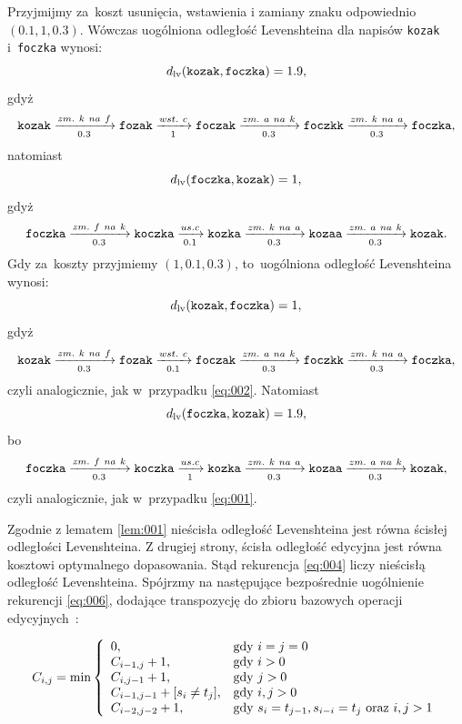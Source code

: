 \documentclass{praca1}
\begin{document}
\begin{example}
Przyjmijmy za~koszt usunięcia, wstawienia i zamiany znaku odpowiednio $(0.1, 1, 0.3)$. Wówczas uogólniona odległość Levenshteina dla napisów \verb|kozak| i~\verb|foczka| wynosi:
\begin{equation}
\label{eq:001}
d_{\mathrm{lv}}(\verb|kozak|, \verb|foczka|) = 1.9,
\end{equation}
gdyż
$$
\verb|kozak|  \xrightarrow[0.3]{zm.\ k\ na\ f} \verb|fozak| \xrightarrow[1]{wst.\ c} \verb|foczak| \xrightarrow[0.3]{zm.\ a\ na\ k} \verb|foczkk| \xrightarrow[0.3]{zm.\ k\ na\ a} \verb|foczka|,
$$
natomiast
\begin{equation}\label{eq:002}
d_{\mathrm{lv}}(\verb|foczka|, \verb|kozak|) = 1,
\end{equation}
gdyż
$$
\verb|foczka|  \xrightarrow[0.3]{zm.\ f\ na\ k} \verb|koczka|  \xrightarrow[0.1]{us. c} \verb|kozka| \xrightarrow[0.3]{zm.\ k\ na\ a} \verb|kozaa| \xrightarrow[0.3]{zm.\ a\ na\ k} \verb|kozak|.
$$
Gdy za~koszty przyjmiemy $(1, 0.1, 0.3)$, to~uogólniona odległość Levenshteina wynosi:
$$
d_{\mathrm{lv}}(\verb|kozak|, \verb|foczka|) = 1,
$$
gdyż
$$
\verb|kozak|  \xrightarrow[0.3]{zm.\ k\ na\ f} \verb|fozak| \xrightarrow[0.1]{wst.\ c} \verb|foczak| \xrightarrow[0.3]{zm.\ a\ na\ k} \verb|foczkk| \xrightarrow[0.3]{zm.\ k\ na\ a} \verb|foczka|,
$$
czyli analogicznie, jak w~przypadku \ref{eq:002}. Natomiast
$$
d_{\mathrm{lv}}(\verb|foczka|, \verb|kozak|) = 1.9,
$$
bo
$$
\verb|foczka|  \xrightarrow[0.3]{zm.\ f\ na\ k} \verb|koczka|  \xrightarrow[1]{us. c} \verb|kozka| \xrightarrow[0.3]{zm.\ k\ na\ a} \verb|kozaa| \xrightarrow[0.3]{zm.\ a\ na\ k} \verb|kozak|,
$$
czyli analogicznie, jak w~przypadku \ref{eq:001}.
\end{example}



Zgodnie z lematem \ref{lem:001} nieścisła odległość Levenshteina jest równa ścisłej odległości Levenshteina. Z drugiej strony, ścisła odległość edycyjna jest równa kosztowi optymalnego dopasowania. Stąd rekurencja \ref{eq:004} liczy nieścisłą odległość Levenshteina. Spójrzmy na następujące bezpośrednie uogólnienie rekurencji \ref{eq:006}, dodające transpozycję do zbioru bazowych operacji edycyjnych~\cite{Boytsov2011:indexingmethods}:

\begin{equation}
\label{eq:007}
C_{i,j} = \min\left\{
\begin{array}{l l}     
    0, & \text{gdy } i = j = 0\\
    C_{i-1, j} + 1, & \text{gdy } i > 0 \\
    C_{i, j-1} + 1, & \text{gdy } j > 0 \\
    C_{i-1, j-1} + [s_{i}\neq t_{j}], & \text{gdy } i, j > 0 \\
    C_{i-2, j-2} + 1, & \text{gdy } s_i = t_{j-1}, s_{i-i} = t_j \text{ oraz } i,j > 1
\end{array}\right.
\end{equation}
\end{document}
